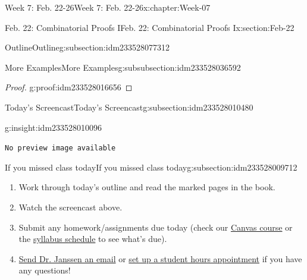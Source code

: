 \documentclass[oneside,10pt,]{book}
\newcommand{\mono}[1]{\texttt{#1}}
\numberwithin{equation}{section}
\newlength{\qrsize}
\newlength{\previewwidth}
\begin{document}
\begin{chapterptx}{Week 7: Feb. 22-26}{}{Week 7: Feb. 22-26}{}{}{x:chapter:Week-07}
\begin{sectionptx}{Feb. 22: Combinatorial Proofs I}{}{Feb. 22: Combinatorial Proofs I}{}{}{x:section:Feb-22}
\begin{subsectionptx}{Outline}{}{Outline}{}{}{g:subsection:idm233528077312}
\begin{subsubsectionptx}{More Examples}{}{More Examples}{}{}{g:subsubsection:idm233528036592}
\begin{proof}{}{g:proof:idm233528016656}
\end{proof}
\end{subsubsectionptx}
\end{subsectionptx}
%
%
\typeout{************************************************}
\typeout{************************************************}
%
\begin{subsectionptx}{Today's Screencast}{}{Today's Screencast}{}{}{g:subsection:idm233528010480}
\begin{insight}{}{g:insight:idm233528010096}%
\setlength{\qrsize}{9em}
\setlength{\previewwidth}{\linewidth}
\addtolength{\previewwidth}{-\qrsize}
\begin{tcbraster}[raster columns=2, raster column skip=1pt, raster halign=center, raster force size=false, raster left skip=0pt, raster right skip=0pt]%
\begin{tcolorbox}[previewstyle, width=\previewwidth]%
\mono{No preview image available}%
\end{tcolorbox}%
\begin{tcolorbox}[qrstyle]%
[QR LINK]\end{tcolorbox}%
\end{tcbraster}%
\end{insight}
\end{subsectionptx}
%
%
\typeout{************************************************}
\typeout{************************************************}
%
\begin{subsectionptx}{If you missed class today}{}{If you missed class today}{}{}{g:subsection:idm233528009712}
%
\begin{enumerate}
\item{}Work through today's outline and read the marked pages in the book.%
\item{}Watch the screencast above.%
\item{}Submit any homework\slash{}assignments due today (check our \href{https://dordt.instructure.com/courses/3110050}{Canvas course} or the \href{https://prof.mkjanssen.org/ds/index.html\#schedule}{syllabus schedule} to see what's due).%
\item{}\href{mailto:mike.janssen@dordt.edu}{Send Dr. Janssen an email} or \href{https://calendly.com/mkjanssen/student-hours}{set up a student hours appointment} if you have any questions!%
\end{enumerate}
\end{subsectionptx}
\end{sectionptx}

\end{chapterptx}
\end{document}
